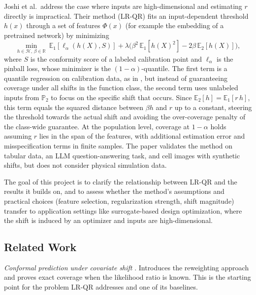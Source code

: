 \documentclass[10pt]{article}
\begin{document}
Joshi et al.\ address the case where inputs are high-dimensional and estimating $r$
directly is impractical. Their method (LR-QR) fits an input-dependent threshold $h(x)$
through a set of features $\Phi(x)$ (for example the embedding of a pretrained network)
by minimizing
\[
\min_{h\in\mathcal H,\,\beta\in\mathbb R}\ \mathbb E_1[\ell_\alpha(h(X),S)]
+ \lambda\big(\beta^2\,\mathbb E_1[h(X)^2]-2\beta\,\mathbb E_2[h(X)]\big),
\]
where $S$ is the conformity score of a labeled calibration point and $\ell_\alpha$ is the
pinball loss, whose minimizer is the $(1{-}\alpha)$-quantile. The first term is a quantile
regression on calibration data, as in \cite{gibbs2025conformal}, but instead of
guaranteeing coverage under all shifts in the function class, the second term uses
unlabeled inputs from $\mathbb{P}_2$ to focus on the specific shift that occurs. Since
$\mathbb E_2[h]=\mathbb E_1[r\,h]$, this term equals the squared distance between
$\beta h$ and $r$ up to a constant, steering the threshold towards the actual shift and
avoiding the over-coverage penalty of the class-wide guarantee. At the population level,
coverage at $1{-}\alpha$ holds assuming $r$ lies in the span of the features, with
additional estimation error and misspecification terms in finite samples. The paper
validates the method on tabular data, an LLM question-answering task, and cell images
with synthetic shifts, but does not consider physical simulation data.

\vspace{-0.25em}

The goal of this project is to clarify the relationship between LR-QR and the results it
builds on, and to assess whether the method's assumptions and practical choices (feature
selection, regularization strength, shift magnitude) transfer to application settings like
surrogate-based design optimization, where the shift is induced by an optimizer and inputs
are high-dimensional.

\subsection*{Related Work}

\vspace{-0.25em}

\textit{Conformal prediction under covariate shift} \cite{tibshirani2019conformal}.
Introduces the reweighting approach and proves exact coverage when the likelihood ratio is
known. This is the starting point for the problem LR-QR addresses and one of its
baselines.
\end{document}
